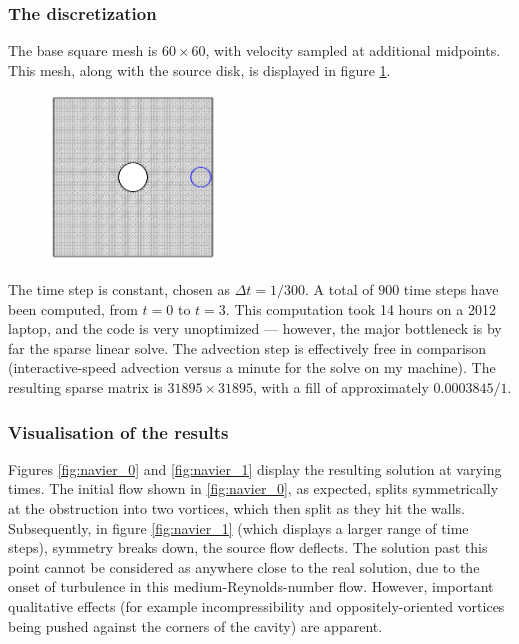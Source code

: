 \subsubsection{The discretization}
The base square mesh is $60 \times 60$, with velocity sampled at additional midpoints. This mesh, along with the source disk, is
displayed in figure \ref{fig:navier_wireframe}.

\begin{figure}[H]
    \centering
    \includegraphics[width=0.4\textwidth]{figures/navier_stokes/wireframe.png}
    \label{fig:navier_wireframe}
\end{figure}

The time step is constant, chosen as $\Delta t = 1/300$. A total of $900$ time steps have been computed, from $t = 0$ to $t = 3$.
This computation took 14 hours on a 2012 laptop, and the code is very unoptimized --- however, the major bottleneck is by far the sparse linear solve. The
advection step is effectively free in comparison (interactive-speed advection versus a minute for the solve on my machine). The resulting sparse matrix is $31895 \times 31895$, with a
fill of approximately $0.0003845/1$.

\subsubsection{Visualisation of the results}
Figures \ref{fig:navier_0} and \ref{fig:navier_1} display the resulting solution at varying times.
The initial flow shown in \ref{fig:navier_0}, as expected, splits symmetrically at the obstruction into two vortices, which then split as they hit the walls.
Subsequently, in figure \ref{fig:navier_1} (which displays a larger range of time steps), symmetry breaks down, the source flow deflects.
The solution past this point cannot be considered as anywhere close to the real solution, due to the onset of turbulence in this medium-Reynolds-number flow. However, important qualitative effects
(for example incompressibility and oppositely-oriented vortices being pushed against the corners of the cavity) are apparent.

